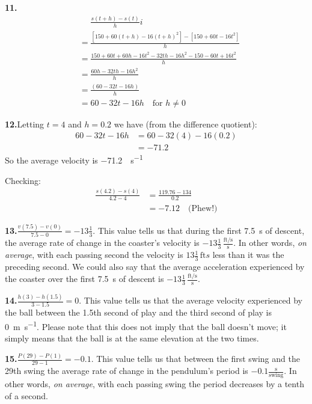 \documentclass[10pt,oneside,]{book}
\theoremstyle{plain}
\theoremstyle{definition}
\numberwithin{equation}{section}
\newcommand{\fe}[2]{#1\mathopen{}\left(#2\right)\mathclose{}}
\begin{document}
\par\smallskip
\noindent\textbf{11.}\quad{}\begin{align*}
&\phantom{={}}\frac{\fe{s}{t+h}-\fe{s}{t}}{h}i\\
&=\frac{\left[150+60(t+h)-16(t+h)^2\right]-\left[150+60t-16t^2\right]}{h}\\
&=\frac{150+60t+60h-16t^2-32th-16h^2-150-60t+16t^2}{h}\\
&=\frac{60h-32th-16h^2}{h}\\
&=\frac{(60-32t-16h)}{h}\\
&=60-32t-16h\quad\text{for $h\neq0$}
\end{align*}%
\par\smallskip
\noindent\textbf{12.}\quad{}Letting \(t=4\) and \(h=0.2\) we have (from the difference quotient):\begin{align*}
60-32t-16h&=60-32(4)-16(0.2)\\
&=-71.2
\end{align*}So the average velocity is \SI{-71.2}{\foot\per\second}%
\par
Checking:\begin{align*}
\frac{\fe{s}{4.2}-\fe{s}{4}}{4.2-4}&=\frac{119.76-134}{0.2}\\
&=-7.12\quad\text{(Phew!)}
\end{align*}%
\par\smallskip
\noindent\textbf{13.}\quad{}\(\frac{\fe{v}{7.5}-\fe{v}{0}}{7.5-0}=-13\frac{1}{3}\). This value tells us that during the first \SI{7.5}{\second} of descent, the average rate of change in the coaster's velocity is \(-13\frac{1}{3}\,\frac{\text{ft/s}}{\text{s}}\).  In other words, \emph{on average}, with each passing second the velocity is \(13\frac{1}{3}\,\text{ft}{s}\) less than it was the preceding second.  We could also say that the average acceleration experienced by the coaster over the first \SI{7.5}{\second} of descent is \(-13\frac{1}{3}\,\frac{\text{ft/s}}{\text{s}}\).%
\par\smallskip
\noindent\textbf{14.}\quad{}\(\frac{\fe{h}{3}-\fe{h}{1.5}}{3-1.5}=0\). This value tells us that the average velocity experienced by the ball between the 1.5th second of play and the third second of play is \SI{0}{\meter\per\second}.  Please note that this does not imply that the ball doesn’t move; it simply means that the ball is at the same elevation at the two times.%
\par\smallskip
\noindent\textbf{15.}\quad{}\(\frac{\fe{P}{29}-\fe{P}{1}}{29-1}=-0.1\). This value tells us that between the first swing and the 29th swing the average rate of change in the pendulum's period is \(-0.1\frac{\text{s}}{\text{swing}}\).  In other words, \emph{on average}, with each passing swing the period decreases by a tenth of a second.%
\end{document}
